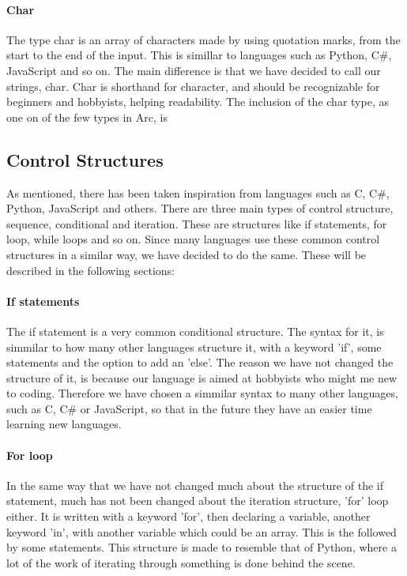 \paragraph*{Char}
The type char is an array of characters made by using quotation marks, from the start to the end of the input.  This is simillar to languages such as Python, C\#, JavaScript and so on. The main difference is that we have decided to call our strings, char. Char is shorthand for character, and should be recognizable for beginners and hobbyists, helping readability. The inclusion of the char type, as one on of the few types in Arc, is 


\subsection{Control Structures}
As mentioned, there has been taken inspiration from languages such as C, C\#, Python, JavaScript and others. There are three main types of control structure, sequence, conditional and iteration. These are structures like if statements, for loop, while loops and so on. Since many languages use these common control structures in a similar way, we have decided to do the same. These will be described in the following sections:

\paragraph*{If statements}
The if statement is a very common conditional structure. The syntax for it, is simmilar to how many other languages structure it, with a keyword 'if', some statements and the option to add an 'else'. The reason we have not changed the structure of it, is because our language is aimed at hobbyists who might me new to coding. Therefore we have chosen a simmilar syntax to many other languages, such as C, C\# or JavaScript, so that in the future they have an easier time learning new languages.

\paragraph*{For loop}
In the same way that we have not changed much about the structure of the if statement, much has not been changed about the iteration structure, 'for' loop either. It is written with a keyword 'for', then declaring a variable, another keyword 'in', with another variable which could be an array. This is the followed by some statements.
This structure is made to resemble that of Python, where a lot of the work of iterating through something is done behind the scene.

